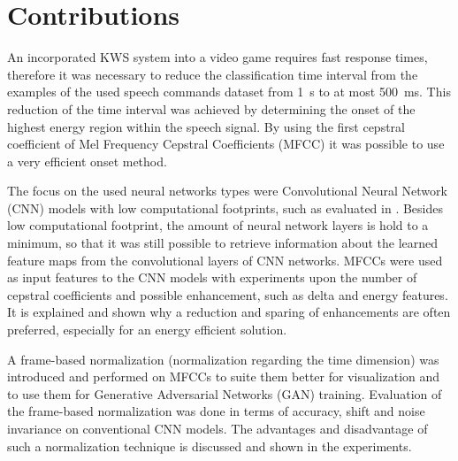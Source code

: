 
\section{Contributions}
\thesisStateRevised
An incorporated KWS system into a video game requires fast response times, therefore it was necessary to reduce the classification time interval from the examples of the used speech commands dataset \cite{Warden2018} from \SI{1}{\second} to at most \SI{500}{\milli\second}.
This reduction of the time interval was achieved by determining the onset of the highest energy region within the speech signal.
By using the first cepstral coefficient of Mel Frequency Cepstral Coefficients (MFCC) it was possible to use a very efficient onset method.

The focus on the used neural networks types were Convolutional Neural Network (CNN) models with low computational footprints, such as evaluated in \cite{Sainath2015}.
Besides low computational footprint, the amount of neural network layers is hold to a minimum, so that it was still possible to retrieve information about the learned feature maps from the convolutional layers of CNN networks.
MFCCs were used as input features to the CNN models with experiments upon the number of cepstral coefficients and possible enhancement, such as delta and energy features.
It is explained and shown why a reduction and sparing of enhancements are often preferred, especially for an energy efficient solution.

A frame-based normalization (normalization regarding the time dimension) was introduced and performed on MFCCs to suite them better for visualization and to use them for Generative Adversarial Networks (GAN) training.
Evaluation of the frame-based normalization was done in terms of accuracy, shift and noise invariance on conventional CNN models.
The advantages and disadvantage of such a normalization technique is discussed and shown in the experiments.

